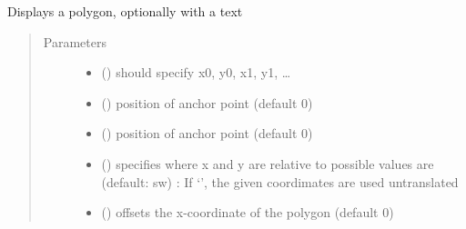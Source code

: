 \documentclass[letterpaper,10pt,english]{sphinxmanual}
\begin{document}

\begin{fulllineitems}
\label{\detokenize{Reference:salabim.AnimatePolygon}}
Displays a polygon, optionally with a text
\begin{quote}\begin{description}
\item[{Parameters}] \leavevmode\begin{itemize}
\item {} 
 () \textendash{} should specify x0, y0, x1, y1, …

\item {} 
 () \textendash{} position of anchor point (default 0)

\item {} 
 () \textendash{} position of anchor point (default 0)

\item {} 
 () \textendash{} specifies where x and y are relative to 
possible values are (default: sw) : 
If ‘’, the given coordimates are used untranslated

\item {} 
 () \textendash{} offsets the x-coordinate of the polygon (default 0)


\end{itemize}
\end{description}
\end{quote}
\end{fulllineitems}
\end{document}
